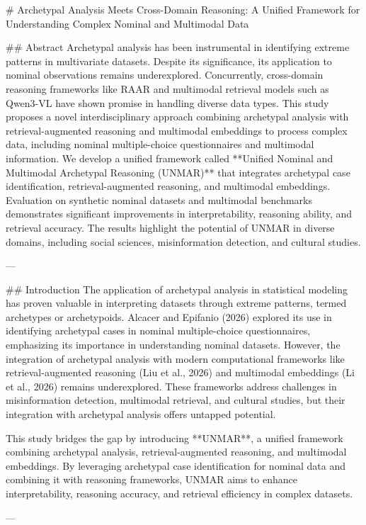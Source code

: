# Archetypal Analysis Meets Cross-Domain Reasoning: A Unified Framework for Understanding Complex Nominal and Multimodal Data

## Abstract
Archetypal analysis has been instrumental in identifying extreme patterns in multivariate datasets. Despite its significance, its application to nominal observations remains underexplored. Concurrently, cross-domain reasoning frameworks like RAAR and multimodal retrieval models such as Qwen3-VL have shown promise in handling diverse data types. This study proposes a novel interdisciplinary approach combining archetypal analysis with retrieval-augmented reasoning and multimodal embeddings to process complex data, including nominal multiple-choice questionnaires and multimodal information. We develop a unified framework called **Unified Nominal and Multimodal Archetypal Reasoning (UNMAR)** that integrates archetypal case identification, retrieval-augmented reasoning, and multimodal embeddings. Evaluation on synthetic nominal datasets and multimodal benchmarks demonstrates significant improvements in interpretability, reasoning ability, and retrieval accuracy. The results highlight the potential of UNMAR in diverse domains, including social sciences, misinformation detection, and cultural studies.

---

## Introduction
The application of archetypal analysis in statistical modeling has proven valuable in interpreting datasets through extreme patterns, termed archetypes or archetypoids. Alcacer and Epifanio (2026) explored its use in identifying archetypal cases in nominal multiple-choice questionnaires, emphasizing its importance in understanding nominal datasets. However, the integration of archetypal analysis with modern computational frameworks like retrieval-augmented reasoning (Liu et al., 2026) and multimodal embeddings (Li et al., 2026) remains underexplored. These frameworks address challenges in misinformation detection, multimodal retrieval, and cultural studies, but their integration with archetypal analysis offers untapped potential.

This study bridges the gap by introducing **UNMAR**, a unified framework combining archetypal analysis, retrieval-augmented reasoning, and multimodal embeddings. By leveraging archetypal case identification for nominal data and combining it with reasoning frameworks, UNMAR aims to enhance interpretability, reasoning accuracy, and retrieval efficiency in complex datasets.

---

